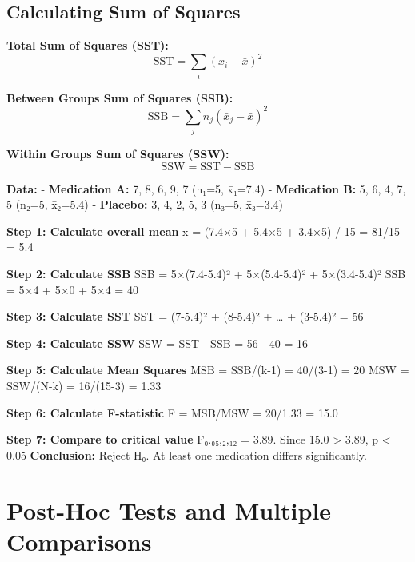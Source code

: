 \documentclass[
  11pt,
  letterpaper,
  oneside]{book}
\begin{document}
\subsection{Calculating Sum of
Squares}\label{calculating-sum-of-squares}

\textbf{Total Sum of Squares (SST):}
\[\text{SST} = \sum_i(x_i - \bar{x})^2\]

\textbf{Between Groups Sum of Squares (SSB):}
\[\text{SSB} = \sum_j n_j(\bar{x}_j - \bar{x})^2\]

\textbf{Within Groups Sum of Squares (SSW):}
\[\text{SSW} = \text{SST} - \text{SSB}\]

\begin{tcolorbox}[enhanced jigsaw, left=2mm, opacityback=0, titlerule=0mm, leftrule=.75mm, colbacktitle=quarto-callout-tip-color!10!white, title=\textcolor{quarto-callout-tip-color}{\faLightbulb}\hspace{0.5em}{Worked Example: Pain Medication Study}, breakable, opacitybacktitle=0.6, rightrule=.15mm, colframe=quarto-callout-tip-color-frame, toprule=.15mm, bottomrule=.15mm, bottomtitle=1mm, toptitle=1mm, coltitle=black, arc=.35mm, colback=white]

\textbf{Data:} - \textbf{Medication A:} 7, 8, 6, 9, 7 (n₁=5, x̄₁=7.4) -
\textbf{Medication B:} 5, 6, 4, 7, 5 (n₂=5, x̄₂=5.4) - \textbf{Placebo:}
3, 4, 2, 5, 3 (n₃=5, x̄₃=3.4)

\textbf{Step 1: Calculate overall mean} x̄ = (7.4×5 + 5.4×5 + 3.4×5) / 15
= 81/15 = 5.4

\textbf{Step 2: Calculate SSB} SSB = 5×(7.4-5.4)² + 5×(5.4-5.4)² +
5×(3.4-5.4)² SSB = 5×4 + 5×0 + 5×4 = 40

\textbf{Step 3: Calculate SST} SST = (7-5.4)² + (8-5.4)² + \ldots{} +
(3-5.4)² = 56

\textbf{Step 4: Calculate SSW} SSW = SST - SSB = 56 - 40 = 16

\textbf{Step 5: Calculate Mean Squares} MSB = SSB/(k-1) = 40/(3-1) = 20
MSW = SSW/(N-k) = 16/(15-3) = 1.33

\textbf{Step 6: Calculate F-statistic} F = MSB/MSW = 20/1.33 = 15.0

\textbf{Step 7: Compare to critical value} F₀.₀₅,₂,₁₂ = 3.89. Since 15.0
\textgreater{} 3.89, p \textless{} 0.05 \textbf{Conclusion:} Reject H₀.
At least one medication differs significantly.

\end{tcolorbox}

\section{Post-Hoc Tests and Multiple
Comparisons}\label{post-hoc-tests-and-multiple-comparisons}
\end{document}
